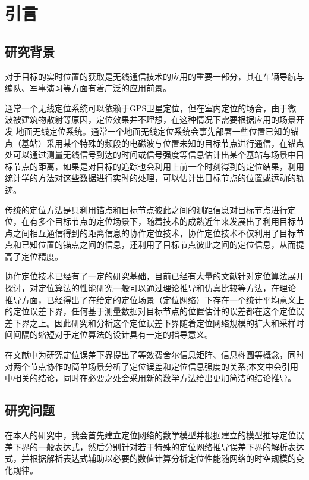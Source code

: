 \chapter{引言}
\label{cha:intro}

\section{研究背景}
对于目标的实时位置的获取是无线通信技术的应用的重要一部分\cite{indoorPos}，其在车辆导航与编队、军事演习等方面有着广泛的应用前景。


通常一个无线定位系统可以依赖于GPS卫星定位，但在室内定位的场合，由于微波被建筑物散射等原因，定位效果并不理想，在这种情况下需要根据应用的场景开发
地面无线定位系统。通常一个地面无线定位系统会事先部署一些位置已知的锚点（基站）采用某个特殊的频段的电磁波与位置未知的目标节点进行通信，在锚点处可以通过测量无线信号到达的时间或信号强度等信息估计出某个基站与场景中目标节点的距离，如果是对目标的追踪也会利用上前一个时刻得到的定位结果，利用统计学的方法对这些数据进行实时的处理，可以估计出目标节点的位置或运动的轨迹。


传统的定位方法是只利用锚点和目标节点彼此之间的测距信息对目标节点进行定位，在有多个目标节点的定位场景下，随着技术的成熟近年来发展出了利用目标节点之间相互通信得到的距离信息的协作定位技术，协作定位技术不仅利用了目标节点和已知位置的锚点之间的信息，还利用了目标节点彼此之间的定位信息，从而提高了定位精度。


协作定位技术已经有了一定的研究基础，目前已经有大量的文献针对定位算法展开探讨，对定位算法的性能研究一般可以通过理论推导和仿真比较等方法，在理论
推导方面，已经得出了在给定的定位场景（定位网络）下存在一个统计平均意义上的定位误差下界\cite{LimitBound}，任何基于测量数据对目标节点的位置估计的误差都在这个定位误差下界之上。因此研究和分析这个定位误差下界随着定位网络规模的扩大和采样时间间隔的缩短对于定位算法的设计具有一定的指导意义。

  在文献\cite{LimitBound2}中为研究定位误差下界提出了等效费舍尔信息矩阵、信息椭圆等概念，同时对两个节点协作的简单场景分析了定位误差和定位信息强度的关系;本文中会引用\cite{LimitBound2}中相关的结论，同时在必要之处会采用新的数学方法给出更加简洁的结论推导。
\section{研究问题}
在本人的研究中，我会首先建立定位网络的数学模型并根据建立的模型推导定位误差下界的一般表达式，然后分别针对若干特殊的定位网络推导误差下界的解析表达式，并根据解析表达式辅助以必要的数值计算分析定位性能随网络的时空规模的变化规律。

